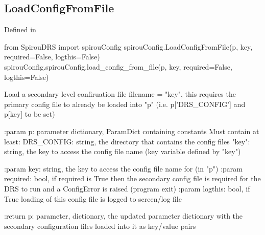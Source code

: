\noindent\begin{minipage}{\textwidth}
\subsection{LoadConfigFromFile}

Defined in \spirouConfig{}

\begin{pythonbox}
from SpirouDRS import spirouConfig
spirouConfig.LoadConfigFromFile(p, key, required=False, logthis=False)
spirouConfig.spirouConfig.load_config_from_file(p, key, required=False, logthis=False)
\end{pythonbox}

\begin{pythondocstring}
Load a secondary level confiruation file filename = "key", this requires
the primary config file to already be loaded into "p"
(i.e. p['DRS_CONFIG'] and p[key] to be set)

:param p: parameter dictionary, ParamDict containing constants
    Must contain at least:
            DRS_CONFIG: string, the directory that contains the config files
            "key": string, the key to access the config file name
                   (key variable defined by "key")

:param key: string, the key to access the config file name for (in "p")
:param required: bool, if required is True then the secondary config file
                 is required for the DRS to run and a ConfigError is raised
                 (program exit)
:param logthis: bool, if True loading of this config file is logged to
                screen/log file

:return p: parameter, dictionary, the updated parameter dictionary with
           the secondary configuration files loaded into it as key/value
           pairs
\end{pythondocstring}
\end{minipage}

